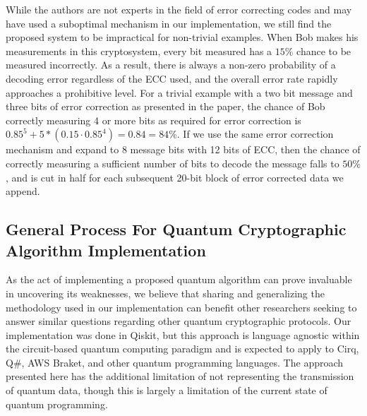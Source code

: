 \documentclass[sigconf]{acmart}
\begin{document}
While the authors are not experts in the field of error correcting codes and may have used a suboptimal mechanism in our implementation, we still find the proposed system to be impractical for non-trivial examples. When Bob makes his measurements in this cryptosystem, every bit measured has a $15\%$ chance to be measured incorrectly. As a result, there is always a non-zero probability of a decoding error regardless of the ECC used, and the overall error rate rapidly approaches a prohibitive level. For a trivial example with a two bit message and three bits of error correction as presented in the paper, the chance of Bob correctly measuring 4 or more bits as required for error correction is $0.85^5 + 5*(0.15\cdot 0.85^4) = 0.84 = 84\%$. If we use the same error correction mechanism and expand to 8 message bits with 12 bits of ECC, then the chance of correctly measuring a sufficient number of bits to decode the message falls to $50\%$, and is cut in half for each subsequent 20-bit block of error corrected data we append.


\subsection{General Process For Quantum Cryptographic Algorithm Implementation}
As the act of implementing a proposed quantum algorithm can prove invaluable in uncovering its weaknesses, we believe that sharing and generalizing the methodology used in our implementation can benefit other researchers seeking to answer similar questions regarding other quantum cryptographic protocols. Our implementation was done in Qiskit, but this approach is language agnostic within the circuit-based quantum computing paradigm and is expected to apply to Cirq, Q\#, AWS Braket, and other quantum programming languages. The approach presented here has the additional limitation of not representing the transmission of quantum data, though this is largely a limitation of the current state of quantum programming.
\end{document}
